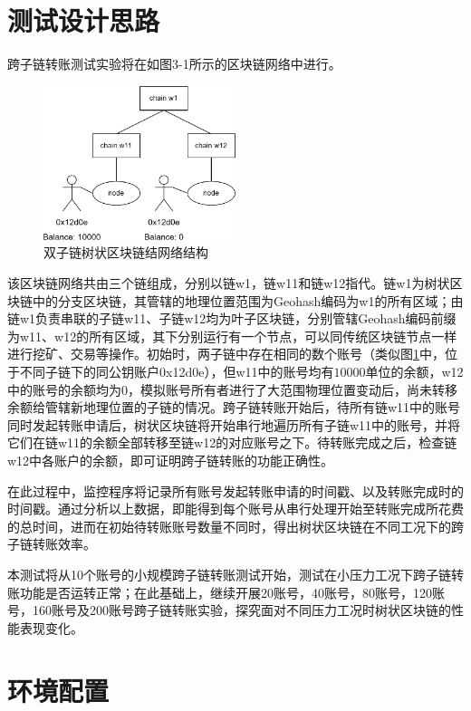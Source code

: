 \section{测试设计思路}

跨子链转账测试实验将在如图3-1所示的区块链网络中进行。

\begin{figure}[htbp]
    \centering
    \includegraphics[width=0.5\textwidth]{images/2leaf-structure.png}
    \caption{双子链树状区块链结网络结构}\label{2leaf结构} %
\end{figure}

该区块链网络共由三个链组成，分别以链w1，链w11和链w12指代。链w1为树状区块链中的分支区块链，其管辖的地理位置范围为Geohash编码为w1的所有区域；由链w1负责串联的子链w11、子链w12均为叶子区块链，分别管辖Geohash编码前缀为w11、w12的所有区域，其下分别运行有一个节点，可以同传统区块链节点一样进行挖矿、交易等操作。初始时，两子链中存在相同的数个账号（类似图\ref{2leaf结构}中，位于不同子链下的同公钥账户0x12d0e），但w11中的账号均有$10000$单位的余额，w12中的账号的余额均为0，模拟账号所有者进行了大范围物理位置变动后，尚未转移余额给管辖新地理位置的子链的情况。跨子链转账开始后，待所有链w11中的账号同时发起转账申请后，树状区块链将开始串行地遍历所有子链w11中的账号，并将它们在链w11的余额全部转移至链w12的对应账号之下。待转账完成之后，检查链w12中各账户的余额，即可证明跨子链转账的功能正确性。

在此过程中，监控程序将记录所有账号发起转账申请的时间戳、以及转账完成时的时间戳。通过分析以上数据，即能得到每个账号从串行处理开始至转账完成所花费的总时间，进而在初始待转账账号数量不同时，得出树状区块链在不同工况下的跨子链转账效率。

本测试将从10个账号的小规模跨子链转账测试开始，测试在小压力工况下跨子链转账功能是否运转正常；在此基础上，继续开展20账号，40账号，80账号，120账号，160账号及200账号跨子链转账实验，探究面对不同压力工况时树状区块链的性能表现变化。

\section{环境配置}

